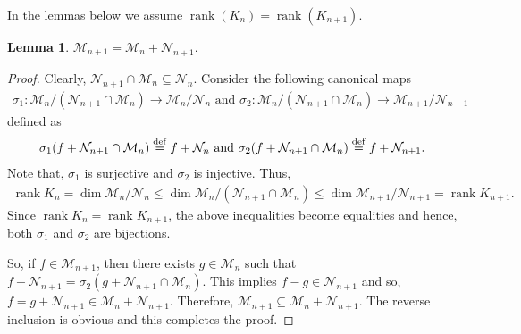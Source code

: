 \documentclass[11pt,reqno]{amsart}
\theoremstyle{plain}
\newtheorem{lemma}[theorem]{Lemma}
\theoremstyle{definition}
\numberwithin{equation}{section}
\newcommand{\bydef}{\stackrel{\rm def}{=}}
\begin{document}
	\vspace{2mm}
    
	In the lemmas below we assume $\operatorname{rank}(K_n) = \operatorname{rank}(K_{n+1})$.
	\begin{lemma} \label{Lem-1}
		 $\mathcal{M}_{n+1} = \mathcal{M}_n + \mathcal{N}_{n+1}.$
	\end{lemma}
	\begin{proof}
		Clearly, $\mathcal{N}_{n+1} \cap \mathcal{M}_n \subseteq \mathcal{N}_n$. Consider the following canonical maps 
		\begin{align*}
			\sigma_1: \mathcal{M}_n / (\mathcal{N}_{n+1} \cap \mathcal{M}_n) \rightarrow \mathcal{M}_n / \mathcal{N}_n  \text{ and } \sigma_2: \mathcal{M}_n / (\mathcal{N}_{n+1} \cap \mathcal{M}_n) \rightarrow \mathcal{M}_{n+1} / \mathcal{N}_{n+1}
		\end{align*}
		defined as 
		\begin{align*}
			\sigma_1(f + \mathcal{N}_{n+1} \cap \mathcal{M}_n) \bydef f + \mathcal{N}_{n} \text{ and } \sigma_2(f + \mathcal{N}_{n+1} \cap \mathcal{M}_n) \bydef f + \mathcal{N}_{n+1}.
		\end{align*}
		Note that, $\sigma_1$ is surjective and $\sigma_2$ is injective. Thus,
		\begin{align*}
			\operatorname{rank} K_n = \operatorname{dim} \mathcal{M}_n / \mathcal{N}_n \leq \operatorname{dim} \mathcal{M}_n / (\mathcal{N}_{n+1} \cap \mathcal{M}_n) \leq \operatorname{dim} \mathcal{M}_{n+1} / \mathcal{N}_{n+1} = \operatorname{rank} K_{n+1}.
		\end{align*} 
		Since $\operatorname{rank} K_n = \operatorname{rank} K_{n+1}$, the above inequalities become equalities and hence, both $\sigma_1$ and $\sigma_2$ are bijections.
		
		So, if $f\in \mathcal{M}_{n+1}$, then there exists $g\in \mathcal{M}_n$ such that $f+\mathcal{N}_{n+1} = \sigma_2(g+ \mathcal{N}_{n+1} \cap \mathcal{M}_n)$. This implies $f-g \in \mathcal{N}_{n+1}$ and so, $f = g+ \mathcal{N}_{n+1} \in \mathcal{M}_n + \mathcal{N}_{n+1}$. Therefore, $\mathcal{M}_{n+1} \subseteq \mathcal{M}_n + \mathcal{N}_{n+1}$. The reverse inclusion is obvious and this completes the proof.
	\end{proof}
	
\end{document}
